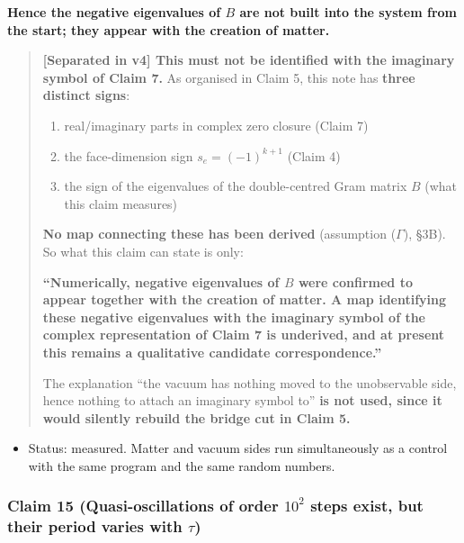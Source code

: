 \documentclass[
  10pt,
]{article}
\providecommand{\tightlist}{%
  \setlength{\itemsep}{0pt}\setlength{\parskip}{0pt}}
\begin{document}
\textbf{Hence the negative eigenvalues of \(B\) are not built into the
system from the start; they appear with the creation of matter.}

\begin{quote}
\textbf{{[}Separated in v4{]} This must not be identified with the
imaginary symbol of Claim 7.} As organised in Claim 5, this note has
\textbf{three distinct signs}:

\begin{enumerate}
\def\labelenumi{\arabic{enumi}.}
\tightlist
\item
  real/imaginary parts in complex zero closure (Claim 7)
\item
  the face-dimension sign \(s_e = (-1)^{k+1}\) (Claim 4)
\item
  the sign of the eigenvalues of the double-centred Gram matrix \(B\)
  (what this claim measures)
\end{enumerate}

\textbf{No map connecting these has been derived} (assumption
(\(\Gamma\)), §3B). So what this claim can state is only:

\textbf{``Numerically, negative eigenvalues of \(B\) were confirmed to
appear together with the creation of matter. A map identifying these
negative eigenvalues with the imaginary symbol of the complex
representation of Claim 7 is underived, and at present this remains a
qualitative candidate correspondence.''}

The explanation ``the vacuum has nothing moved to the unobservable side,
hence nothing to attach an imaginary symbol to'' \textbf{is not used,
since it would silently rebuild the bridge cut in Claim 5.}
\end{quote}

\begin{itemize}
\tightlist
\item
  Status: measured. Matter and vacuum sides run simultaneously as a
  control with the same program and the same random numbers.
\end{itemize}

\subsubsection{\texorpdfstring{Claim 15 (Quasi-oscillations of order
\(10^2\) steps exist, but their period varies with
\(\tau\))}{Claim 15 (Quasi-oscillations of order 10\^{}2 steps exist, but their period varies with \textbackslash tau)}}\label{claim-15-quasi-oscillations-of-order-102-steps-exist-but-their-period-varies-with-tau}
\end{document}
